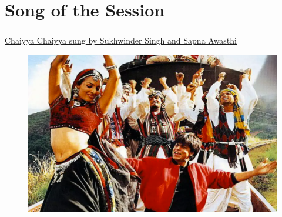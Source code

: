 \documentclass[xcolor=dvipsnames]{beamer}
\begin{document}
\section{Song of the Session}
\begin{frame}
\frametitle{\insertsectionhead}
\href{https://www.youtube.com/watch?v=PQmrmVs10X8}{Chaiyya Chaiyya sung by Sukhwinder Singh and Sapna Awasthi}
\begin{figure}
\includegraphics[scale=0.5]{images/song.png}
\end{figure}
\end{frame}
\end{document}
